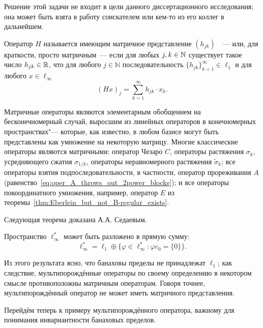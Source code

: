 Решение этой задачи не входит в цели данного диссертационного исследования;
она может быть взята в работу соискателем или кем-то из его коллег в дальнейшем.

\begin{definition}
	Оператор $H$ называется имеющим матричное представление $(h_{jk})$~~--- или, для краткости,
	просто матричным~--- если для любых $j,k\in \mathbb{N}$ существует такое число $h_{jk}\in\mathbb{R}$,
	что для любого $j\in \mathbb N$ последовательность $\{h_{jk}\}_{k=1}^\infty \in \ell_1$
	и для любого $x\in\ell_\infty$
	\begin{equation}
		(Hx)_j = \sum_{k=1}^{\infty} h_{jk}\cdot x_k
		.
	\end{equation}
\end{definition}

Матричные операторы являются элементарным обобщением на бесконечномерный случай,
выросшим из линейных операторов в конечномерных пространствах"---
которые, как известно, в любом базисе могут быть представлены как умножение на некоторую матрицу.
Многие классические операторы являются матричными:
оператор Чезаро $C$, операторы растяжения $\sigma_k$, усредняющего сжатия $\sigma_{1/k}$,
операторы неравномерного растяжения $\tilde\sigma_k$;
все операторы взятия подпоследовательности, в частности,
оператор прореживания $A$ (равенство~\eqref{eq:oper_A_throws_out_2power_blocks});
и все операторы покоординатного умножения, например, оператор $E$ из теоремы~\ref{thm:Eberlein_but_not_B-regular_exists}.

Следующая теорема доказана А.А. Седаевым.

\begin{theorem}
	Пространство $\ell_\infty^*$ может быть разложено в прямую сумму:
	\begin{equation}
		\ell_\infty^* = \ell_1 \oplus \{\varphi \in\ell_\infty^* : \varphi c_0 = \{0\}\}
		.
	\end{equation}
\end{theorem}

Из этого результата ясно, что банаховы пределы не принадлежат $\ell_1$;
как следствие,
мультипорождённые операторы по своему определению в некотором смысле противоположны матричным операторам.
Говоря точнее, мультипорождённый оператор не может иметь матричного представления.

Перейдём теперь к примеру мультипорождённого оператора, важному для понимания инвариантности банаховых пределов.

